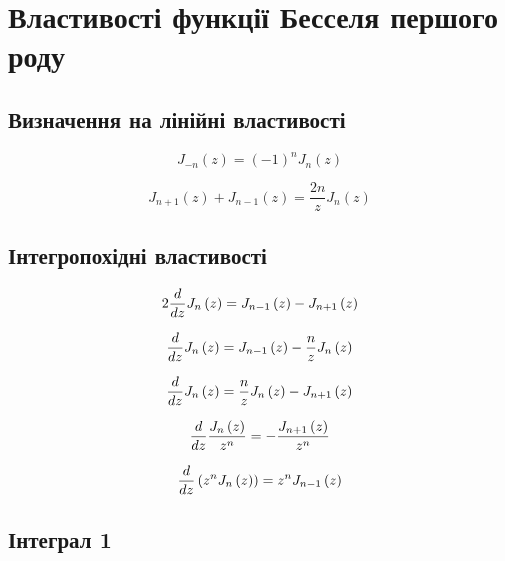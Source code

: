 \chapter{Властивості функції Бесселя першого роду}
\label{ch:bessel}

\section{Визначення на лінійні властивості}

\begin{equation}
J_{-n} \left( z \right) = \left( -1 \right)^n J_n \left( z \right)
\end{equation}

\begin{equation}
J_{n+1} \left( z \right) + J_{n-1} \left( z \right) = 
\frac{2n}{z} J_n \left( z \right)
\end{equation}

\section{Інтегропохідні властивості}

\begin{equation}
2 \frac{d }{d z} J_n \left( z \right) = 
J_{n-1} \left( z \right) - J_{n+1} \left( z \right) 
\end{equation}

\begin{equation}
\frac{d }{d z} J_n \left( z \right) = 
J_{n-1} \left( z \right) - \frac{n}{z} J_{n} \left( z \right) 
\end{equation}

\begin{equation}
\frac{d }{d z} J_n \left( z \right) = 
\frac{n}{z} J_{n} \left( z \right) - J_{n+1} \left( z \right) 
\end{equation}

\begin{equation}
\frac{d }{d z} \frac{ J_n \left( z \right) }{ z^n }  = 
- \frac{ J_{n+1} \left( z \right) }{ z^n }
\end{equation}

\begin{equation}
\frac{d }{d z} \left( z^n J_n \left( z \right) \right)  = 
z^n J_{n-1} \left( z \right)
\end{equation}

\section{Інтеграл 1}

